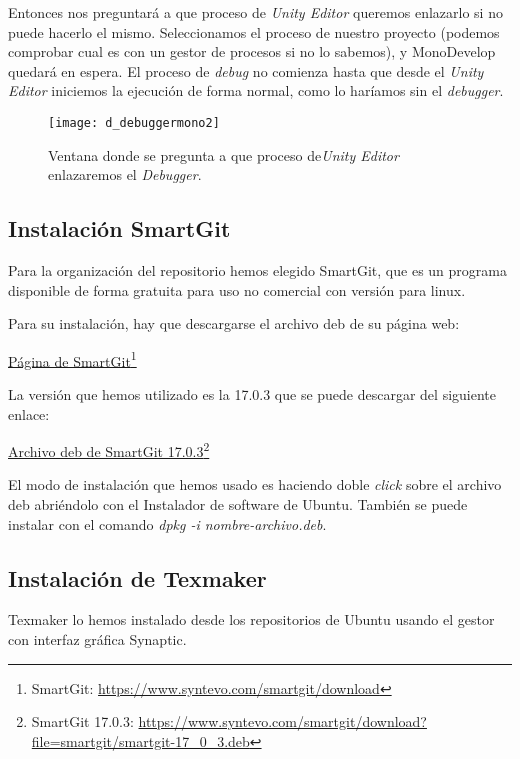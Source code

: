 Entonces nos preguntará a que proceso de \textit{Unity Editor} queremos enlazarlo si no puede hacerlo el mismo. Seleccionamos el proceso de nuestro proyecto (podemos comprobar cual es con un gestor de procesos si no lo sabemos), y MonoDevelop quedará en espera. El proceso de \textit{debug} no comienza hasta que desde el \textit{Unity Editor} iniciemos la ejecución de forma normal, como lo haríamos sin el \textit{debugger}.

\begin{figure}[htpb]
    \centering
    \texttt{[image: d\_debuggermono2]}
    \caption[Enlace del\textit{Debugger} con \textit{Unity Editor} de MonoDevelop]{Ventana donde se pregunta a que proceso de\textit{Unity Editor} enlazaremos el \textit{Debugger}.}
    \label{fig:debuggermono}
\end{figure}

\subsection{Instalación SmartGit}

Para la organización del repositorio hemos elegido SmartGit, que es un programa disponible de forma gratuita para uso no comercial con versión para linux.

Para su instalación, hay que descargarse el archivo deb de su página web:

\href{https://www.syntevo.com/smartgit/download}{Página de SmartGit}\footnote{SmartGit: \url{https://www.syntevo.com/smartgit/download}}

La versión que hemos utilizado es la 17.0.3 que se puede descargar del siguiente enlace:

\href{https://www.syntevo.com/smartgit/download?file=smartgit/smartgit-17_0_3.deb}{Archivo deb de SmartGit 17.0.3}\footnote{SmartGit 17.0.3: \url{https://www.syntevo.com/smartgit/download?file=smartgit/smartgit-17_0_3.deb}}

El modo de instalación que hemos usado es haciendo doble \textit{click} sobre el archivo deb abriéndolo con el Instalador de software de Ubuntu. También se puede instalar con el comando \textit{dpkg -i nombre-archivo.deb}.

\subsection{Instalación de Texmaker}
Texmaker lo hemos instalado desde los repositorios de Ubuntu usando el gestor con interfaz gráfica Synaptic.

